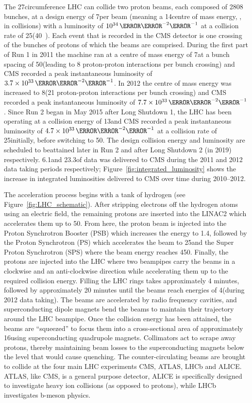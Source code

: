 The 27\km circumference LHC can collide two proton beams, each composed of 2808 bunches, at a design energy
of 7\TeV per beam (meaning a 14\TeV centre of mass energy, \roots, in collisions) with a luminosity of
$10^{34}\cm^{-2}\s^{-1}$ at a collision rate of 25\ns (40~\MHz). Each event that is recorded in the
CMS detector is one crossing of the bunches of protons of which the beams are comprised. During the first part
of Run 1 in 2011 the machine ran at a centre of mass energy of 7\TeV at a bunch spacing of 50\ns (leading to 8
proton-proton interactions per bunch crossing) and CMS recorded a peak instantaneous luminosity of
$3.7\times10^{33}\cm^{-2}\s^{-1}$. In 2012 the centre of mass energy was increased to 8\TeV (21
proton-proton interactions per bunch crossing) and CMS recorded a peak instantaneous luminosity of
$7.7\times10^{33}\cm^{-2}\s^{-1}$. Since Run 2 began in May 2015 after Long Shutdown 1, the LHC has
been operating at a collision energy of 13\TeV and CMS recorded a peak instantaneous luminosity of
$4.7\times10^{33}\cm^{-2}\s^{-1}$ at a collision rate of 25\ns initially, before switching to 50\ns.
The design collision energy and luminosity are scheduled to beattained later in Run 2 and after Long Shutdown
2 (in 2019) respectively. 6.1\fbinv and 23.3\fbinv of data was delivered to CMS during the 2011 and 2012 data
taking periods respectively; Figure~\ref{fig:integrated_luminosity} shows the increase in integrated
luminosities delivered to CMS over time during 2010--2012.

The acceleration process begins with a tank of hydrogen (see Figure~\ref{fig:LHC_schematic}). After stripping
electrons off the hydrogen atoms using an electric field, the remaining protons are inserted into the LINAC2
which accelerates them up to 50\MeV. From here, the proton beam is injected into the Proton Synchrotron
Booster (PSB) which increases the energy to 1.4\GeV, followed by the Proton Synchrotron (PS) which accelerates
the beam to 25\GeV and the Super Proton Synchrotron (SPS) where the beam energy reaches 450\GeV. Finally, the
protons are injected into the LHC where two beampipes carry the beams in a clockwise and an anti-clockwise
direction while accelerating them up to the required collision energy. Filling the LHC rings takes
approximately 4 minutes, followed by approximately 20 minutes until the beams reach energies of 4\TeV (during
2012 data taking). The beams are accelerated by radio frequency cavities, and superconducting dipole magnets
bend the beams to maintain their trajectory around the LHC beampipe. Once the collision energy has been
attained, the beams are ``squeezed'' to focus them into a cross-sectional area of approximately 16\um using
superconducting quadrupole magnets. Collimators act to scrape away protons, thereby maintaining beam losses to
the superconducting magnets below the level that would cause quenching. The counter-circulating beams are
brought to collide at the four main LHC experiments CMS, ATLAS, LHCb and ALICE. ATLAS, like CMS, is a general
purpose detector, ALICE is specifically designed to investigate heavy ion collisions (as opposed to protons),
while LHCb investigates b-meson physics.

